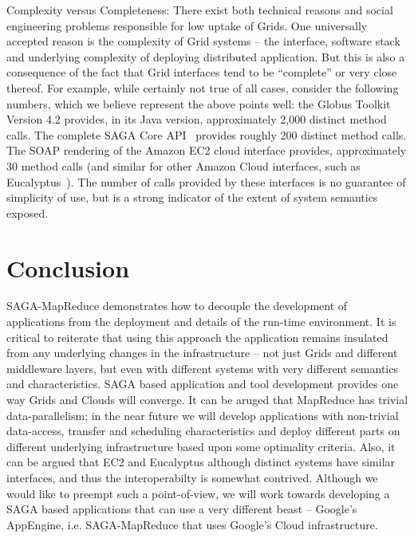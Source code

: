 \documentclass[conference,final]{IEEEtran}
\newcommand{\sagamapreduce }{SAGA-MapReduce }
\begin{document}
Complexity versus Completeness: There exist both technical reasons and
social engineering problems responsible for low uptake of Grids. One
universally accepted reason is the complexity of Grid systems -- the
interface, software stack and underlying complexity of deploying
distributed application. But this is also a consequence of the fact
that Grid interfaces tend to be ``complete'' or very close thereof.
For example, while certainly not true of all cases, consider the
following numbers, which we believe represent the above points well:
the Globus Toolkit Version 4.2 provides, in its Java version,
approximately 2,000 distinct method calls.  The complete SAGA Core
API~\cite{saga-core} provides roughly 200 distinct method calls.  The
SOAP rendering of the Amazon EC2 cloud interface provides,
approximately 30 method calls (and similar for other Amazon Cloud
interfaces, such as Eucalyptus~\cite{eucalyptus_url}).  The number of
calls provided by these interfaces is no guarantee of simplicity of
use, but is a strong indicator of the extent of system semantics
exposed.

\section{Conclusion}



\sagamapreduce demonstrates how to decouple the development of
applications from the deployment and details of the run-time
environment.  It is critical to reiterate that using this approach the
application remains insulated from any underlying changes in the
infrastructure -- not just Grids and different middleware layers, but
even with different systems with very different semantics and
characteristics.  SAGA based application and tool development provides
one way Grids and Clouds will converge.  It can be aruged that
MapReduce has trivial data-parallelism; in the near future we will
develop applications with non-trivial data-access, transfer and
scheduling characteristics and deploy different parts on different
underlying infrastructure based upon some optimality criteria.  Also,
it can be argued that EC2 and Eucalyptus although distinct systems
have similar interfaces, and thus the interoperabilty is somewhat
contrived. Although we would like to preempt such a point-of-view, we
will work towards developing a SAGA based applications that can use a
very different beast -- Google's AppEngine, i.e. \sagamapreduce that
uses Google's Cloud infrastructure.
\end{document}
